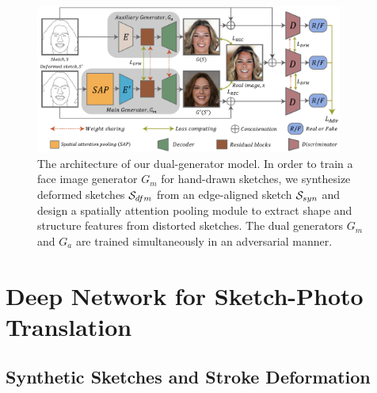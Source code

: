 


\begin{figure}[tb]
	\includegraphics[width=0.9\textwidth]{figs/architecture}
	\caption{The architecture of our dual-generator model. In order to train a face image generator $G_m$ for hand-drawn sketches, we synthesize deformed sketches $\mathcal{S}_{dfm}$ from an edge-aligned sketch $\mathcal{S}_{syn}$ and design a spatially attention pooling module to extract shape and structure features from distorted sketches. The dual generators $G_m$ and $G_a$ are trained simultaneously in an adversarial manner. }
	\label{fig:architecture}
\end{figure}
%

\section{Deep Network for Sketch-Photo Translation}
\label{sec:network}

%



\subsection{Synthetic Sketches and Stroke Deformation}
\label{subsec:algorithm_data}



